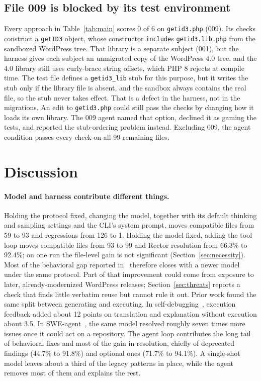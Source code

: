 \documentclass[11pt]{article}
\newcommand{\code}[1]{\texttt{#1}}
\begin{document}
\subsection{File 009 is blocked by its test environment}
\label{sec:009}

Every approach in Table~\ref{tab:main} scores 0 of 6 on \code{getid3.php} (009).
Its checks construct a \code{getID3} object, whose constructor \code{include}s \code{getid3.lib.php} from the sandboxed WordPress tree.
That library is a separate subject (001), but the harness gives each subject an unmigrated copy of the WordPress 4.0 tree, and the 4.0 library still uses curly-brace string offsets, which PHP 8 rejects at compile time.
The test file defines a \code{getid3\_lib} stub for this purpose, but it writes the stub only if the library file is absent, and the sandbox always contains the real file, so the stub never takes effect.
That is a defect in the harness, not in the migrations.
An edit to \code{getid3.php} could still pass the checks by changing how it loads its own library.
The 009 agent named that option, declined it as gaming the tests, and reported the stub-ordering problem instead.
Excluding 009, the agent condition passes every check on all 99 remaining files.

\section{Discussion}

\paragraph{Model and harness contribute different things.}
Holding the protocol fixed, changing the model, together with its default thinking and sampling settings and the CLI's system prompt, moves compatible files from 59 to 93 and regressions from 126 to 1.
Holding the model fixed, adding the tool loop moves compatible files from 93 to 99 and Rector resolution from 66.3\% to 92.4\%; on one run the file-level gain is not significant (Section~\ref{sec:necessity}).
Most of the behavioral gap reported in~\cite{mahmud2026modernization} therefore closes with a newer model under the same protocol.
Part of that improvement could come from exposure to later, already-modernized WordPress releases; Section~\ref{sec:threats} reports a check that finds little verbatim reuse but cannot rule it out.
Prior work found the same split between generating and executing.
In self-debugging~\cite{chen2024selfdebug}, execution feedback added about 12 points on translation and explanation without execution about 3.5.
In SWE-agent~\cite{yang2024sweagent}, the same model resolved roughly seven times more issues once it could act on a repository.
The agent loop contributes the long tail of behavioral fixes and most of the gain in resolution, chiefly of deprecated findings (44.7\% to 91.8\%) and optional ones (71.7\% to 94.1\%).
A single-shot model leaves about a third of the legacy patterns in place, while the agent removes most of them and explains the rest.
\end{document}
